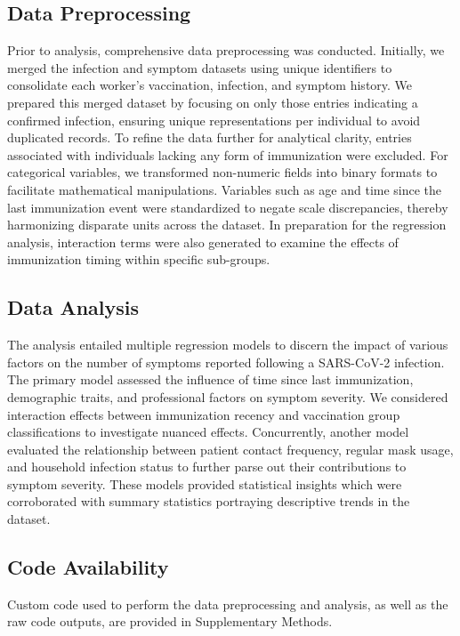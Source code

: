 \documentclass[11pt]{article}
\begin{document}
\subsection*{Data Preprocessing}
Prior to analysis, comprehensive data preprocessing was conducted. Initially, we merged the infection and symptom datasets using unique identifiers to consolidate each worker's vaccination, infection, and symptom history. We prepared this merged dataset by focusing on only those entries indicating a confirmed infection, ensuring unique representations per individual to avoid duplicated records. To refine the data further for analytical clarity, entries associated with individuals lacking any form of immunization were excluded. For categorical variables, we transformed non-numeric fields into binary formats to facilitate mathematical manipulations. Variables such as age and time since the last immunization event were standardized to negate scale discrepancies, thereby harmonizing disparate units across the dataset. In preparation for the regression analysis, interaction terms were also generated to examine the effects of immunization timing within specific sub-groups.

\subsection*{Data Analysis}
The analysis entailed multiple regression models to discern the impact of various factors on the number of symptoms reported following a SARS-CoV-2 infection. The primary model assessed the influence of time since last immunization, demographic traits, and professional factors on symptom severity. We considered interaction effects between immunization recency and vaccination group classifications to investigate nuanced effects. Concurrently, another model evaluated the relationship between patient contact frequency, regular mask usage, and household infection status to further parse out their contributions to symptom severity. These models provided statistical insights which were corroborated with summary statistics portraying descriptive trends in the dataset.\subsection*{Code Availability}

Custom code used to perform the data preprocessing and analysis, as well as the raw code outputs, are provided in Supplementary Methods.




\end{document}
